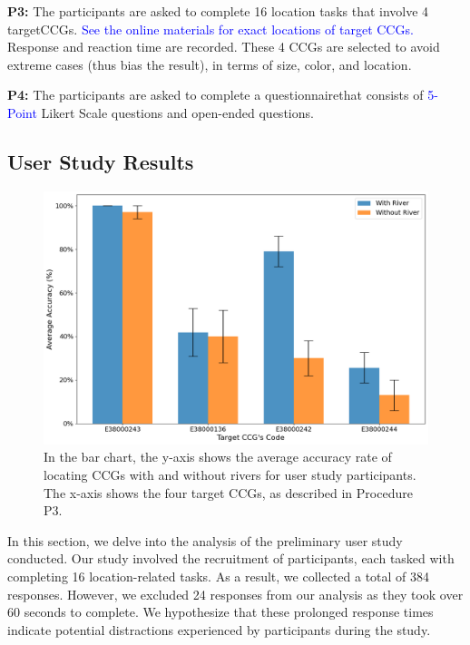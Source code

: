 \documentclass[Afour,sagev,times]{sagej}
\newcommand{\new}[1]{\textcolor{blue}{#1}}
\begin{document}
\textbf{P3:} The participants are asked to complete 16 location tasks that involve 4 targetCCGs.
\new{See the online materials for exact locations of target CCGs\footnotemark[\value{footnote}].}
Response and reaction time are recorded.
These 4 CCGs are selected to avoid extreme cases (thus bias the result), in terms of size, color, and location.

\textbf{P4:} The participants are asked to complete a questionnaire\footnotemark[\value{footnote}] that consists of \new{5-Point} Likert Scale questions and open-ended questions.


\subsection{User Study Results}
\label{subsec:{User Study Results}}

{
\begin{figure}[b!]
    \centering
    \includegraphics[width=\columnwidth,keepaspectratio]{accuracy.png}
    \caption{In the bar chart, the y-axis shows the average accuracy rate of locating CCGs with and without rivers for user study participants.
        The x-axis shows the four target CCGs, as described in Procedure P3.}
    \label{fig:task-acc}
\end{figure}
}


In this section, we delve into the analysis of the preliminary user study conducted.
Our study involved the recruitment of \pCount participants, each tasked with completing 16 location-related tasks.
As a result, we collected a total of 384 responses.
However, we excluded 24 responses from our analysis as they took over 60 seconds to complete.
We hypothesize that these prolonged response times indicate potential distractions experienced by participants during the study.
\end{document}
